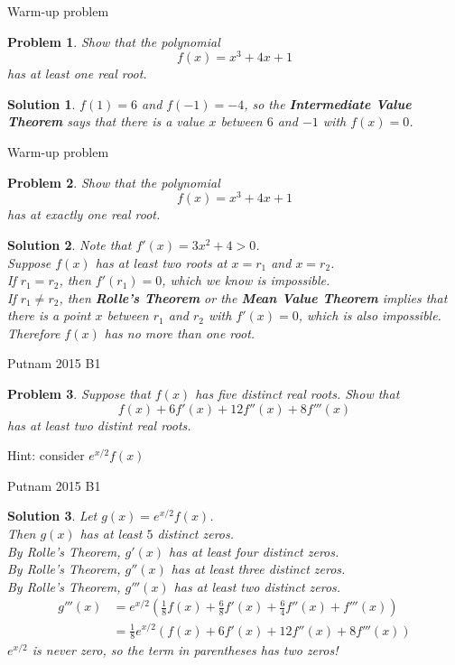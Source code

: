\documentclass{beamer}
\newtheorem{prob}{Problem}
\newtheorem{soln}{Solution}
\begin{document}
\begin{frame}{Warm-up problem}
\begin{prob}
Show that the polynomial
$$f(x) = x^3 + 4x + 1$$
has at least one real root.
\end{prob}
\pause
\begin{soln}
$f(1) = 6$ and $f(-1) = -4$, so the \textbf{Intermediate Value Theorem} says that there is a value $x$ between $6$ and $-1$ with $f(x) = 0$.
\end{soln}
\end{frame}

\begin{frame}{Warm-up problem}
\begin{prob}
Show that the polynomial
$$f(x) = x^3 + 4x + 1$$
has at exactly one real root.
\end{prob}
\pause
\begin{soln}
Note that $f'(x) = 3x^2 + 4 > 0$.\\
\pause
Suppose $f(x)$ has at least two roots at $x=r_1$ and $x = r_2$.\\
\pause
If $r_1=r_2$, then $f'(r_1) = 0$, which we know is impossible.\\
\pause
If $r_1\neq r_2$, then \textbf{Rolle's Theorem} or the \textbf{Mean Value Theorem} implies that there is a point $x$ between $r_1$ and $r_2$ with $f'(x) = 0$, which is also impossible.\\
\pause
Therefore $f(x)$ has no more than one root.
\end{soln}
\end{frame}


\begin{frame}{Putnam 2015 B1}
\begin{prob}
Suppose that $f(x)$ has five distinct real roots. 
Show that
$$f(x) + 6f'(x) + 12f''(x) + 8f'''(x)$$
has at least two distint real roots.
\end{prob}
\pause
Hint: consider $e^{x/2}f(x)$
\end{frame}

\begin{frame}{Putnam 2015 B1}
\begin{soln}
Let $g(x) = e^{x/2}f(x)$.\\\pause
Then $g(x)$ has at least $5$ distinct zeros.\\\pause
By Rolle's Theorem, $g'(x)$ has at least four distinct zeros.\\\pause
By Rolle's Theorem, $g''(x)$ has at least three distinct zeros.\\\pause
By Rolle's Theorem, $g'''(x)$ has at least two distinct zeros.\\\pause
\pause
\begin{align*}
g'''(x)
  & = e^{x/2}(\frac{1}{8}f(x) + \frac{6}{8}f'(x) + \frac{6}{4}f''(x) + f'''(x))\\
  & = \frac{1}{8}e^{x/2}(f(x) + 6f'(x) + 12f''(x) + 8f'''(x))
\end{align*}
\pause
$e^{x/2}$ is never zero, so the term in parentheses has two zeros!
\end{soln}
\end{frame}
\end{document}
